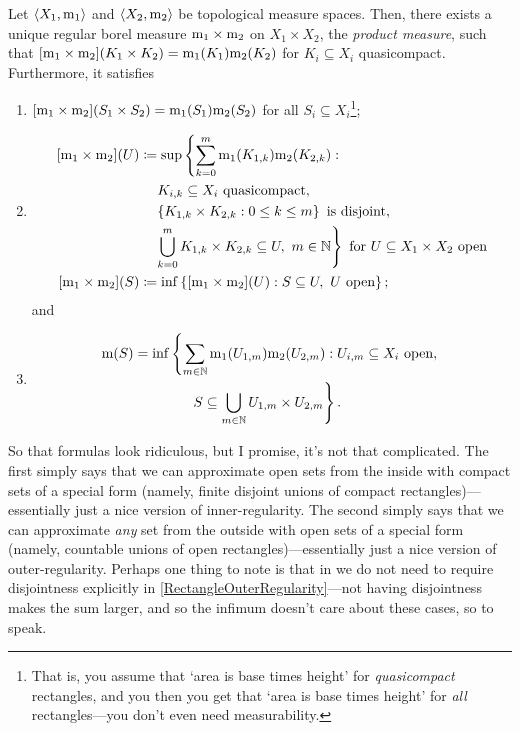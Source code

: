 \begin{thm}
Let $\langle X_1,\mathrm{m} _1\rangle$ and $\langle X_2,\mathrm{m} _2\rangle$ be topological measure spaces.  Then, there exists a unique regular borel measure $\mathrm{m} _1\times \mathrm{m} _2$ on $X_1\times X_2$, the \emph{product measure}, such that $[\mathrm{m} _1\times \mathrm{m} _2](K_1\times K_2)=\mathrm{m} _1(K_1)\mathrm{m} _2(K_2)$ for $K_i\subseteq X_i$ quasicompact.  Furthermore, it satisfies
\begin{enumerate}
\item $[\mathrm{m} _1\times \mathrm{m} _2](S_1\times S_2)=\mathrm{m} _1(S_1)\mathrm{m} _2(S_2)$ for all $S_i\subseteq X_i$\footnote{That is, you assume that `area is base times height' for \emph{quasicompact} rectangles, and you then you get that `area is base times height' for \emph{all} rectangles---you don't even need measurability.};
\item
\begin{equation}\label{RectangleInnerRegularity}
\begin{split}
[\meas _1\times \meas _2](U) & \coloneqq \sup \left\{ \sum _{k=0}^m\meas _1(K_{1,k})\meas _2(K_{2,k}):\right. \\
& \quad \left. K_{i,k}\subseteq X_i\text{ quasicompact},\right. \\
& \quad \left. \left\{ K_{1,k}\times K_{2,k}:0\leq k\leq m\right\} \text{ is disjoint},\right. \\
& \quad \left. \bigcup _{k=0}^mK_{1,k}\times K_{2,k}\subseteq U,\ m\in \N \right\} \text{ for }U\subseteq X_1\times X_2\text{ open} \\
[\meas _1\times \meas _2](S) & \coloneqq \inf \left\{ [\meas _1\times \meas _2](U):S\subseteq U,\ U\text{ open}\right\} ;
\end{split}
\end{equation}
and
\item
\begin{equation}\label{RectangleOuterRegularity}
\begin{split}
\mathrm{m} (S) & =\inf \left\{ \sum _{m\in \mathbb{N}}\mathrm{m} _1(U_{1,m})\mathrm{m} _2(U_{2,m}):U_{i,m}\subseteq X_i\text{ open},\right. \\
& \qquad \qquad \left. S\subseteq \bigcup _{m\in \mathbb{N}}U_{1,m}\times U_{2,m}\right\} .
\end{split}
\end{equation}
\end{enumerate}
\begin{rmk}
So that formulas look ridiculous, but I promise, it's not that complicated.  The first simply says that we can approximate open sets from the inside with compact sets of a special form (namely, finite disjoint unions of compact rectangles)---essentially just a nice version of inner-regularity.  The second simply says that we can approximate \emph{any} set from the outside with open sets of a special form (namely, countable unions of open rectangles)---essentially just a nice version of outer-regularity.  Perhaps one thing to note is that in we do not need to require disjointness explicitly in \eqref{RectangleOuterRegularity}---not having disjointness makes the sum larger, and so the infimum doesn't care about these cases, so to speak.

\end{rmk}
\end{thm}
